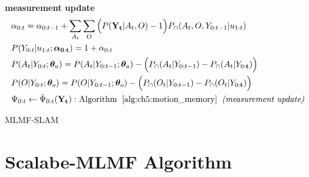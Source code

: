 \begin{appendices}
\begin{center}
\begin{minipage}{\linewidth}
\begin{algorithm}[H]
\BlankLine
\nonl\hrulefill	\\
\nonl\textbf{measurement update}
\nonl\begin{align}
 &\alpha_{0:t}       = \alpha_{0:t-1} + \sum\limits_{A_t}\sum\limits_{O} \Big(P(\mathbf{Y_t}|A_t,O) - 1\Big)P_{\cap}(A_t,O,Y_{0:t-1}|u_{1:t}) \nonumber \\
 &P(Y_{0:t}|u_{1:t};\boldsymbol{\alpha}_{\mathbf{0:t}}) = 1 + \alpha_{0:t} \nonumber\\
 &P(A_t|Y_{0:t};\boldsymbol{\theta}_a)     = P(A_t|Y_{0:t-1};\boldsymbol{\theta}_a) - \Big(P_{\cap}(A_t|Y_{0:t-1}) -  P_{\cap}(A_t|Y_{0:\mathbf{t}}) \Big) \nonumber \\
 &P(O|Y_{0:t};\boldsymbol{\theta}_o)       = P(O|Y_{0:t-1};\boldsymbol{\theta}_o) -  \Big(  P_{\cap}(O_t|Y_{0:t-1}) -  P_{\cap}(O_t|Y_{0:\mathbf{t}})\Big) \nonumber \\    
 &\Psi_{0:t} \gets \bar{\Psi}_{0:t}(\mathbf{Y_t}): \mathrm{Algorithm\;\; \ref{alg:ch5:motion_memory}\;\; \textit{(measurement update)}} \nonumber
 \end{align}
\caption{MLMF-SLAM}
\end{algorithm} 
\end{minipage}
\end{center}


\section{Scalabe-MLMF Algorithm}\label{app:scalable-mlmf}

\begin{center}
\begin{minipage}{\linewidth}

\begin{algorithm}[H]
\label{alg:scalabe-mrf-slam}
\BlankLine

\end{algorithm}
\end{minipage}
\end{center}
\end{appendices}
